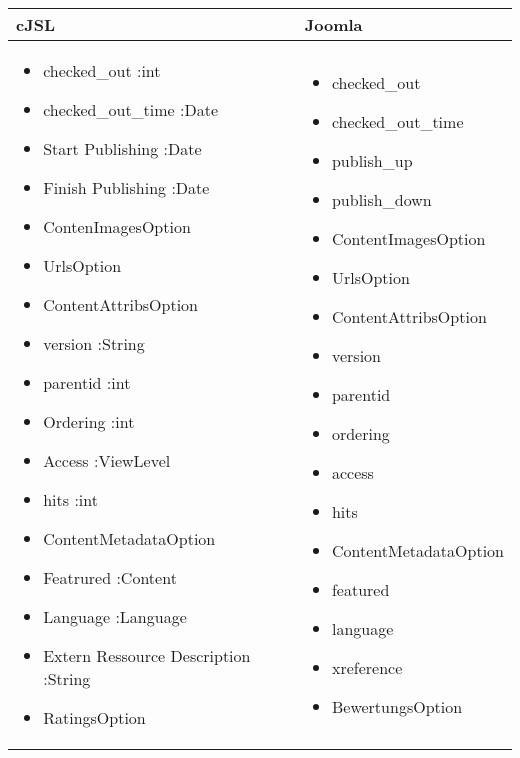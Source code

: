 \begin{minipage}{0.7\textwidth}
\begin{tabular}{|p{} | p{}|}
\hline
\textbf{cJSL} & \textbf{Joomla} \\ 
\hline
 \begin{itemize}
 \item checked\_out :int
  \item checked\_out\_time  :Date
 \item Start Publishing :Date
 \item Finish Publishing :Date
 \item ContenImagesOption
\item UrlsOption
\item ContentAttribsOption
\item version :String
 \item parentid :int
\item Ordering :int
\item Access :ViewLevel
\item hits :int
\item ContentMetadataOption
\item Featrured :Content
\item Language :Language
\item Extern Ressource Description :String
\item RatingsOption
 \end{itemize}
 & 
\begin{itemize}
\item checked\_out 
  \item checked\_out\_time 
  \item publish\_up 
  \item publish\_down 
  \item ContentImagesOption
 \item UrlsOption
 \item ContentAttribsOption
 \item version 
 \item parentid 
 \item ordering 
 \item access 
 \item hits 
 \item ContentMetadataOption 
 \item featured 
 \item language 
 \item xreference
 \item BewertungsOption
\end{itemize}
\\
\hline
\end{tabular}
\end{minipage}

